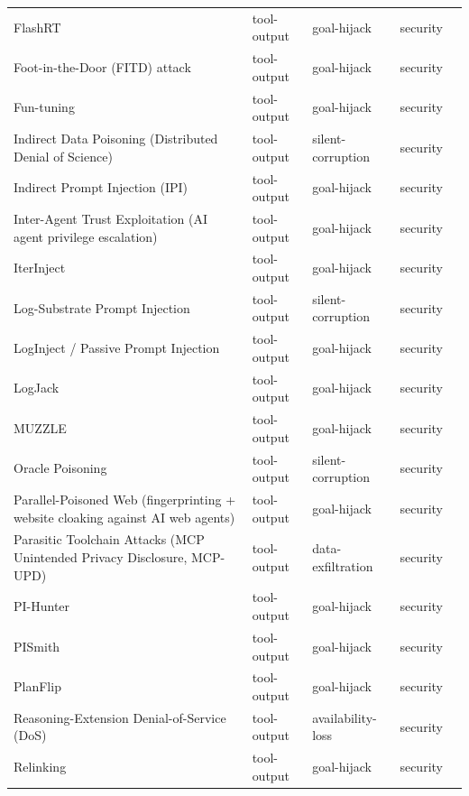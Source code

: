 \begin{longtable}{@{}p{}llll@{}}
FlashRT & tool-output & goal-hijack & security & \cite{wang-2026-flashrt} \\
Foot-in-the-Door (FITD) attack & tool-output & goal-hijack & security & \cite{nakash-2024-breaking} \\
Fun-tuning & tool-output & goal-hijack & security & \cite{labunets-2025-funtuning} \\
Indirect Data Poisoning (Distributed Denial of Science) & tool-output & silent-corruption & security & \cite{gyevnar-2026-distributed} \\
Indirect Prompt Injection (IPI) & tool-output & goal-hijack & security & \cite{greshake-2023-not} \\
Inter-Agent Trust Exploitation (AI agent privilege escalation) & tool-output & goal-hijack & security & \cite{lupinacci-2025-dark} \\
IterInject & tool-output & goal-hijack & security & \cite{chen-2026-iterinject} \\
Log-Substrate Prompt Injection & tool-output & silent-corruption & security & \cite{pandey-2026-poisoning} \\
LogInject / Passive Prompt Injection & tool-output & goal-hijack & security & \cite{karanjai-2026-context} \\
LogJack & tool-output & goal-hijack & security & \cite{shah-2026-logjack} \\
MUZZLE & tool-output & goal-hijack & security & \cite{syros-2026-muzzle} \\
Oracle Poisoning & tool-output & silent-corruption & security & \cite{kereopayorke-2026-oracle} \\
Parallel-Poisoned Web (fingerprinting + website cloaking against AI web agents) & tool-output & goal-hijack & security & \cite{zychlinski-2025-whole} \\
Parasitic Toolchain Attacks (MCP Unintended Privacy Disclosure, MCP-UPD) & tool-output & data-exfiltration & security & \cite{zhao-2025-parasites} \\
PI-Hunter & tool-output & goal-hijack & security & \cite{he-2026-pihunter} \\
PISmith & tool-output & goal-hijack & security & \cite{yin-2026-pismith} \\
PlanFlip & tool-output & goal-hijack & security & \cite{wang-2026-planflip} \\
Reasoning-Extension Denial-of-Service (DoS) & tool-output & availability-loss & security & \cite{zhou-2026-shield} \\
Relinking & tool-output & goal-hijack & security & \cite{liu-2026-safe} \\

\end{longtable}
